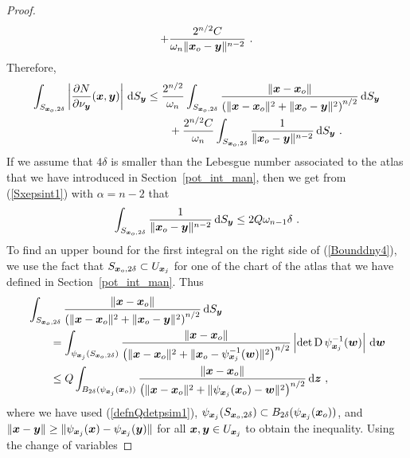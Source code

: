 \begin{proof}
\begin{align*}
+ \frac{2^{n/2} C}{\omega_n \|{\bm{x}}_o-{\bm{y}}\|^{n-2}} \ .
\end{align*}
Therefore,
\begin{equation} \label{Bounddny4}
\begin{split}
\int_{S_{{\bm{x}}_o,2\delta}}
\left| \frac{\partial{N}}{\partial \nu_{{\bm{y}}}}({\bm{x}},{\bm{y}}) \right| \,\mathrm{d}{S}_{{\bm{y}}}
&\leq \frac{2^{n/2}}{\omega_n} \int_{S_{{\bm{x}}_o,2\delta}}
\frac{\left\|{\bm{x}}-{\bm{x}}_o\right\|}
{\left(\|{\bm{x}}-{\bm{x}}_o\|^2 + \|{\bm{x}}_o-{\bm{y}}\|^2\right)^{n/2}}
\,\mathrm{d}{S}_{{\bm{y}}} \\
&\qquad + \frac{2^{n/2} C}{\omega_n} \int_{S_{{\bm{x}}_o,2\delta}}
\frac{1}{\|{\bm{x}}_o-{\bm{y}}\|^{n-2}} \,\mathrm{d}{S}_{{\bm{y}}} \ .
\end{split}
\end{equation}
If we assume that $4\delta$ is smaller than the Lebesgue number
associated to the atlas that we have introduced in
Section~\ref{pot_int_man}, then we get from (\ref{Sxepsint1}) with
$\alpha = n-2$ that
\begin{equation} \label{Bounddny5}
\int_{S_{{\bm{x}}_o,2\delta}} \frac{1}{\|{\bm{x}}_o-{\bm{y}}\|^{n-2}} \,\mathrm{d}{S}_{{\bm{y}}}
\leq 2 Q \omega_{n-1} \delta \ .
\end{equation}
To find an upper bound for the first integral on the right side of
(\ref{Bounddny4}), we use the fact that
$S_{{\bm{x}}_o,2\delta} \subset U_{{\bm{x}}_j}$ for one of the chart of
the atlas that we have defined in Section~\ref{pot_int_man}.
Thus
\begin{align*}
&\int_{S_{{\bm{x}}_o,2\delta}}
\frac{\left\|{\bm{x}}-{\bm{x}}_o\right\|}
{\left(\|{\bm{x}}-{\bm{x}}_o\|^2 + \|{\bm{x}}_o-{\bm{y}}\|^2\right)^{n/2}}
\,\mathrm{d}{S}_{{\bm{y}}} \\
&\qquad = \int_{\psi_{{\bm{x}}_j}(S_{{\bm{x}}_o,2\delta})}
\frac{\left\|{\bm{x}}-{\bm{x}}_o\right\|}
{\left(\|{\bm{x}}-{\bm{x}}_o\|^2
+ \|{\bm{x}}_o-\psi_{{\bm{x}}_j}^{-1}({\bm{w}})\|^2\right)^{n/2}}
\left| \det \operatorname{D} \psi_{{\bm{x}}_j}^{-1}({\bm{w}}) \right| \,\mathrm{d}{{\bm{w}}} \\
&\qquad \leq Q \int_{B_{2\delta}(\psi_{{\bm{x}}_j}({\bm{x}}_o))}
\frac{\left\|{\bm{x}}-{\bm{x}}_o\right\|}
{\left(\|{\bm{x}}-{\bm{x}}_o\|^2
+ \|\psi_{{\bm{x}}_j}({\bm{x}}_o) -{\bm{w}}\|^2\right)^{n/2}} \,\mathrm{d}{{\bm{z}}} \ ,
\end{align*}
where we have used (\ref{defnQdetpsim1}),
$\displaystyle \psi_{{\bm{x}}_j}(S_{{\bm{x}}_o,2\delta}) \subset
B_{2\delta}(\psi_{{\bm{x}}_j}({\bm{x}}_o))$, and
$\displaystyle \|{\bm{x}}-{\bm{y}}\| 
\geq \|\psi_{{\bm{x}}_j}({\bm{x}}) - \psi_{{\bm{x}}_j}({\bm{y}})\|$ for all
$\displaystyle {\bm{x}},{\bm{y}} \in U_{{\bm{x}}_j}$ to obtain the
inequality.  Using the change of variables

\end{proof}
